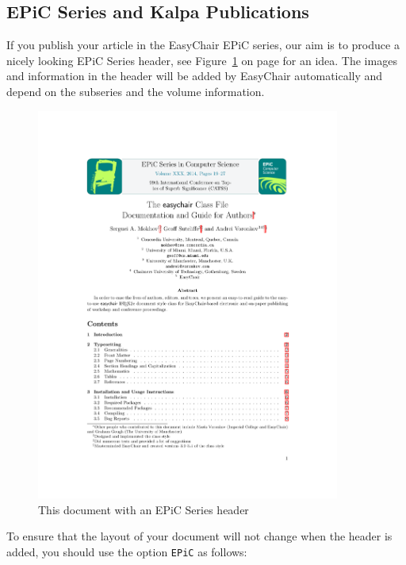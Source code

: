 \documentclass[EPiC]{easychair}
\begin{document}
\subsection{EPiC Series and Kalpa Publications}
\label{subsec:EPiC}

If you publish your article in the EasyChair EPiC series, our aim is to produce
a nicely looking EPiC Series header, see Figure~\ref{fig:epicheader} on page
\pageref{fig:epicheader} for an idea. The images and information in the header
will be added by EasyChair automatically and depend on the subseries and the
volume information.

\begin{figure}
  \begin{centering}
    \includegraphics[width=0.89\textwidth]{epic.pdf}
    \caption{This document with an EPiC Series header} 
    \label{fig:epicheader}
  \end{centering}
\end{figure}

To ensure that the layout of your document will not change when the header is
added, you should use the option \texttt{EPiC} as follows:
\end{document}
